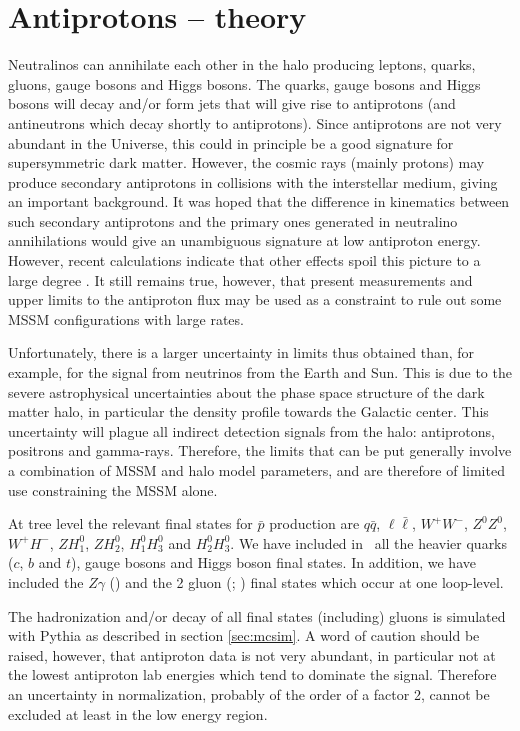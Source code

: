 \section{Antiprotons -- theory}

Neutralinos can annihilate each other in the halo producing leptons,
quarks, gluons, gauge bosons and Higgs bosons. The quarks, gauge
bosons and Higgs bosons will decay and/or form jets that will give
rise to antiprotons (and antineutrons which decay shortly to
antiprotons). Since antiprotons are not very abundant in the Universe,
this could in principle be a good signature for supersymmetric dark
matter. However, the cosmic rays (mainly protons) may produce
secondary antiprotons in collisions with the interstellar medium,
giving an important background. It was hoped that the difference in
kinematics between such secondary antiprotons and the primary ones
generated in neutralino annihilations would give an unambiguous
signature at low antiproton energy. However, recent calculations
indicate that other effects spoil this picture to a large degree
\cite{pbar,gaisserpbar}. It still remains true, however, that present
measurements and upper limits to the antiproton flux may be used as a
constraint to rule out some MSSM configurations with large rates.

Unfortunately, there is a larger uncertainty in
limits thus obtained than, for example, for the signal from neutrinos
from the Earth and Sun. This is due to the severe astrophysical
uncertainties about the phase space structure of the dark matter
halo, in particular the density profile towards the Galactic center.
This uncertainty will plague all indirect detection signals from
the halo: antiprotons, positrons and gamma-rays. Therefore, the
limits that can be put generally involve a combination of
MSSM and halo model parameters, and are therefore of limited use
constraining the MSSM alone.

At tree level the relevant final states for $\bar{p}$ production
are $q \bar{q}$, $\ell \bar{\ell}$, $W^{+} W^{-}$, $Z^{0} Z^{0}$,
$W^{+} H^{-}$, $Z H_{1}^{0}$, $Z H_{2}^{0}$, $H_{1}^{0} H_{3}^{0}$ and
$H_{2}^{0} H_{3}^{0}$. We have included in \ds\ all the heavier quarks ($c$,
$b$ and $t$), gauge bosons and Higgs boson final states.
  In addition, we have included the $Z \gamma$ (\cite{ub}) and
the 2 gluon (\cite{bua}; \cite{lp}) final states which occur at one
loop-level.


The hadronization and/or decay of all final states (including) gluons
is simulated with {\sc Pythia} as described in section \ref{sec:mcsim}.
A word of caution should be raised, however, that
antiproton data is not very abundant, in particular not at the
lowest antiproton lab energies which tend to dominate the signal.
Therefore an uncertainty in normalization, probably of the order of a
factor 2, cannot be excluded at least in the low energy region.

